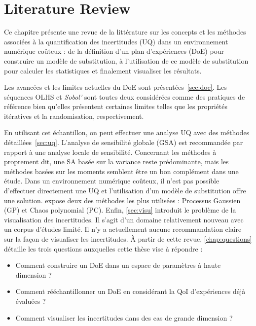 \chapter{Literature Review}\label{chap:review}

\begin{chapquote}
Ce chapitre présente une revue de la littérature sur les concepts et les méthodes associées à la quantification des incertitudes (UQ) dans un environnement numérique coûteux : de la définition d'un plan d'expériences (DoE) pour construire un modèle de substitution, à l'utilisation de ce modèle de substitution pour calculer les statistiques et finalement visualiser les résultats.

Les avancées et les limites actuelles du DoE sont présentées~\cref{sec:doe}. Les séquences OLHS et \emph{Sobol'} sont toutes deux considérées comme des pratiques de référence bien qu'elles présentent certaines limites telles que les propriétés itératives et la randomisation, respectivement.

En utilisant cet échantillon, on peut effectuer une analyse UQ avec des méthodes détaillées~\cref{sec:uq}. L'analyse de sensibilité globale (GSA) est recommandée par rapport à une analyse locale de sensibilité. Concernant les méthodes à proprement dit, une SA basée sur la variance reste prédominante, mais les méthodes basées sur les moments semblent être un bon complément dans une étude. Dans un environnement numérique coûteux, il n'est pas possible d'effectuer directement une UQ et l'utilisation d'un modèle de substitution offre une solution.  expose deux des méthodes les plus utilisées : Processus Gaussien (GP) et Chaos polynomial (PC). Enfin, \cref{sec:visu} introduit le problème de la visualisation des incertitudes. Il s'agit d'un domaine relativement nouveau avec un corpus d'études limité. Il n'y a actuellement aucune recommandation claire sur la façon de visualiser les incertitudes. À partir de cette revue, \cref{chap:questions} détaille les trois questions auxquelles cette thèse vise à répondre :
\begin{itemize}
\item Comment construire un DoE dans un espace de paramètres à haute dimension ?
\item Comment rééchantillonner un DoE en considérant la QoI d'expériences déjà évaluées ?
\item Comment visualiser les incertitudes dans des cas de grande dimension ?
\end{itemize}

\end{chapquote}

